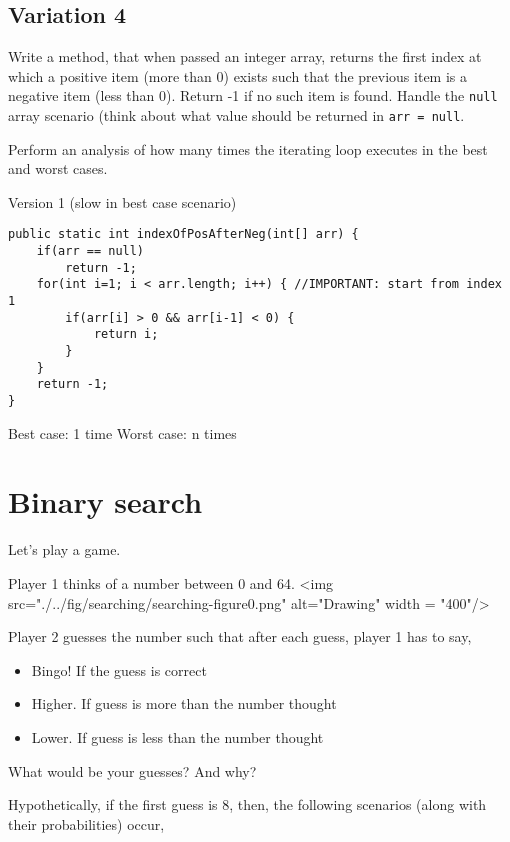 \subsection{Variation 4}

\begin{exercise}
Write a method, that when passed an integer array, returns the first index at which a positive item (more than 0) exists such that the previous item is a negative item (less than 0). Return -1 if no such item is found. Handle the \texttt{null} array scenario (think about what value should be returned in \texttt{arr = null}.

Perform an analysis of how many times the iterating loop executes in the best and worst cases.
\end{exercise}
\begin{answer}
Version 1 (slow in best case scenario)
\begin{lstlisting}
public static int indexOfPosAfterNeg(int[] arr) {
	if(arr == null)
		return -1;
	for(int i=1; i < arr.length; i++) { //IMPORTANT: start from index 1
		if(arr[i] > 0 && arr[i-1] < 0) {
			return i;
		}
	}
	return -1;
}
\end{lstlisting}	
Best case: 1 time
Worst case: n times
\end{answer}

\section{Binary search}

Let's play a game.

Player 1 thinks of a number between 0 and 64. 
\vskip 1cm
<img src="./../fig/searching/searching-figure0.png" alt="Drawing" width = "400"/>
\vskip 1cm

Player 2 guesses the number such that after each guess, player 1 has to say,

\begin{itemize}
\item Bingo! If the guess is correct
\item Higher. If guess is more than the number thought	
\item Lower. If guess is less than the number thought	
\end{itemize}

What would be your guesses? And why?

Hypothetically, if the first guess is 8, then, the following scenarios (along with their probabilities) occur,

